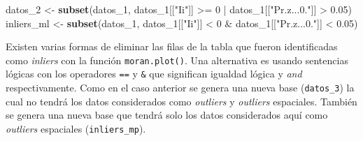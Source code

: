 \documentclass[11pt,b5paper,]{krantz}
\newenvironment{Shaded}{}{}
\newcommand{\DecValTok}[1]{\textcolor[rgb]{0.25,0.63,0.44}{#1}}
\newcommand{\FloatTok}[1]{\textcolor[rgb]{0.25,0.63,0.44}{#1}}
\newcommand{\KeywordTok}[1]{\textcolor[rgb]{0.00,0.44,0.13}{\textbf{#1}}}
\newcommand{\NormalTok}[1]{#1}
\newcommand{\OperatorTok}[1]{\textcolor[rgb]{0.40,0.40,0.40}{#1}}
\newcommand{\OtherTok}[1]{\textcolor[rgb]{0.00,0.44,0.13}{#1}}
\newcommand{\StringTok}[1]{\textcolor[rgb]{0.25,0.44,0.63}{#1}}
\begin{document}
\begin{Shaded}
\begin{Highlighting}[]
\NormalTok{datos_}\DecValTok{2}\NormalTok{ <-}
\StringTok{  }\KeywordTok{subset}\NormalTok{(datos_}\DecValTok{1}\NormalTok{, }
\NormalTok{         datos_}\DecValTok{1}\NormalTok{[[}\StringTok{"Ii"}\NormalTok{]] }\OperatorTok{>=}\StringTok{ }\DecValTok{0} \OperatorTok{|}\StringTok{ }
\StringTok{           }\NormalTok{datos_}\DecValTok{1}\NormalTok{[[}\StringTok{"Pr.z...0."}\NormalTok{]] }\OperatorTok{>}\StringTok{ }\FloatTok{0.05}\NormalTok{)}
\NormalTok{inliers_ml <-}
\StringTok{  }\KeywordTok{subset}\NormalTok{(datos_}\DecValTok{1}\NormalTok{, }
\NormalTok{         datos_}\DecValTok{1}\NormalTok{[[}\StringTok{"Ii"}\NormalTok{]] }\OperatorTok{<}\StringTok{ }\DecValTok{0} \OperatorTok{&}
\StringTok{           }\NormalTok{datos_}\DecValTok{1}\NormalTok{[[}\StringTok{"Pr.z...0."}\NormalTok{]] }\OperatorTok{<}\StringTok{ }\FloatTok{0.05}\NormalTok{)}
\end{Highlighting}
\end{Shaded}

Existen varias formas de eliminar las filas de la tabla que fueron identificadas como \emph{inliers} con la función \texttt{moran.plot()}. Una alternativa es usando sentencias lógicas con los operadores \texttt{==} y \texttt{\&} que significan igualdad lógica y \emph{and} respectivamente. Como en el caso anterior se genera una nueva base (\texttt{datos\_3}) la cual no tendrá los datos considerados como \emph{outliers} y \emph{outliers} espaciales. También se genera una nueva base que tendrá solo los datos considerados aquí como \emph{outliers} espaciales (\texttt{inliers\_mp}).

\begin{Shaded}
\end{Shaded}
\end{document}
